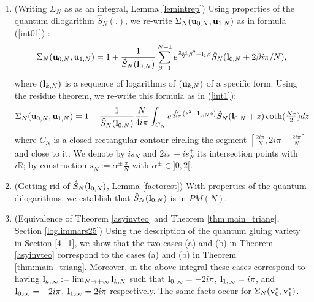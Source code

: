\documentclass[11pt]{amsart}
\newcommand{\mr}{\mathbb{R}}
\newcommand{\bu}{{\bf u}}
\newcommand{\bv}{{\bf v}}
\newcommand{\bl}{{\bf l}}
\begin{document}
\begin{enumerate}
\item[IV)] (Writing $\Sigma_N$ as as an integral, Lemma \ref{lemintrep}) Using properties of the quantum dilogarithm $\hat S_N(.)$, we re-write $\Sigma_N(\bu_{0,N},\bu_{1,N})$ as in formula (\ref{int01}) :
$$\Sigma_N(\bu_{0,N},\bu_{1,N}) = 1 + \frac{1}{\hat S_N(\bl_{0,N})}\sum_{\beta=1}^{N-1} e^{\frac{2\pi i}{N} \beta^2 -\bl_1\beta} \textstyle \hat S_N(\bl_{0,N}+2\beta i\pi/N),$$
where $(\bl_{k,N})$ is a sequence of logarithms of $(\bu_{k,N})$ of a specific form. Using the residue theorem, we re-write this formula as in (\ref{int1}):
$$\Sigma_N(\bu_{0,N},\bu_{1,N}) =1+ \frac{1}{\hat S_N(\bl_{0,N})} \frac{N}{4i\pi}\int_{C_N} e^{\frac{N}{2i\pi}(z^2 - \bl_{1,N}z)}\hat S_N(\bl_{0,N} + z)\textstyle \coth(\frac{Nz}{2})dz$$
where $C_N$ is a closed rectangular contour circling the segment $\textstyle [\frac{2i\pi}{N}, 2i\pi - \frac{2i\pi}{N}]$ and close to it. We denote by $is_N^-$ and $2i\pi-is_N^+$ its  intersection points with $i\mr$; by construction $\textstyle s_N^\pm:=\alpha^\pm\frac{\pi}{N}$ with $\alpha^\pm\in ]0,2[$.
\smallskip

\item[V)] (Getting rid of $\hat S_N(\bl_{0,N})$, Lemma \ref{factorest}) With properties of the quantum dilogarithms, we establish that $\hat S_N(\bl_{0,N})$ is in $PM(N)$.
\smallskip

\item[VI)] (Equivalence of Theorem \ref{asyinvteo} and Theorem \ref{thm:main_triang}, Section \ref{loglimmars25}) Using the description of the quantum gluing variety in Section \ref{4_1}, we show that the two cases (a) and (b) in Theorem \ref{asyinvteo} correspond to the cases (a) and (b) in Theorem \ref{thm:main_triang}. Moreover, in the above integral these cases correspond to having $\bl_{k,\infty}:= \textstyle \lim_{N\rightarrow +\infty} \bl_{k,N}$ such that $\bl_{0,\infty} = -2i\pi$, $\bl_{1,\infty} = i\pi$, and $\bl_{0,\infty} = -2i\pi$, $\bl_{1,\infty} =2i\pi$ respectively. The same facts occur for $\Sigma_N(\bv_0^*,\bv_1^*)$.
\end{enumerate}
\medskip
\end{document}
